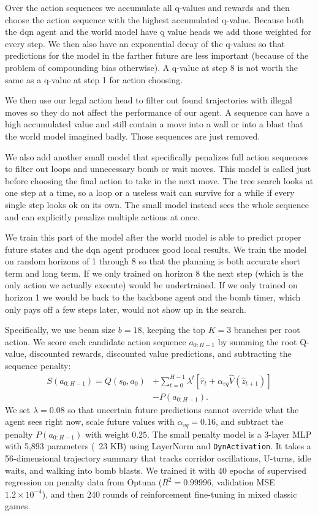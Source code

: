 \documentclass[article, 10pt]{IEEEtran}
\begin{document}
Over the action sequences we accumulate all q-values and rewards and then choose the action sequence with the highest accumulated q-value. Because both the dqn agent and the world model have q value heads we add those weighted for every step. We then also have an exponential decay of the q-values so that predictions for the model in the farther future are less important (because of the problem of compounding bias otherwise). A q-value at step 8 is not worth the same as a q-value at step 1 for action choosing.

We then use our legal action head to filter out found trajectories with illegal moves so they do not affect the performance of our agent. A sequence can have a high accumulated value and still contain a move into a wall or into a blast that the world model imagined badly. Those sequences are just removed.

We also add another small model that specifically penalizes full action sequences to filter out loops and unnecessary bomb or wait moves. This model is called just before choosing the final action to take in the next move. The tree search looks at one step at a time, so a loop or a useless wait can survive for a while if every single step looks ok on its own. The small model instead sees the whole sequence and can explicitly penalize multiple actions at once. 

We train this part of the model after the world model is able to predict proper future states and the dqn agent produces good local results. We train the model on random horizons of 1 through 8 so that the planning is both accurate short term and long term. If we only trained on horizon 8 the next step (which is the only action we actually execute) would be undertrained. If we only trained on horizon 1 we would be back to the backbone agent and the bomb timer, which only pays off a few steps later, would not show up in the search.

Specifically, we use beam size $b=18$, keeping the top $K=3$ branches per root action. We score each candidate action sequence $a_{0:H-1}$ by summing the root Q-value, discounted rewards, discounted value predictions, and subtracting the sequence penalty:
\begin{equation}
\begin{aligned}
S(a_{0:H-1}) = Q(s_0, a_0) &+ \sum_{t=0}^{H-1} \lambda^t \left[\hat{r}_t + \alpha_{vq} \hat{V}(\hat{z}_{t+1})\right] \\
&- P(a_{0:H-1}).
\end{aligned}
\end{equation}
We set $\lambda = 0.08$ so that uncertain future predictions cannot override what the agent sees right now, scale future values with $\alpha_{vq} = 0.16$, and subtract the penalty $P(a_{0:H-1})$ with weight $0.25$. The small penalty model is a 3-layer MLP with 5,893 parameters (~23 KB) using LayerNorm and \texttt{DynActivation}. It takes a 56-dimensional trajectory summary that tracks corridor oscillations, U-turns, idle waits, and walking into bomb blasts. We trained it with 40 epochs of supervised regression on penalty data from Optuna ($R^2 = 0.99996$, validation MSE $1.2 \times 10^{-4}$), and then 240 rounds of reinforcement fine-tuning in mixed classic games.
\end{document}
